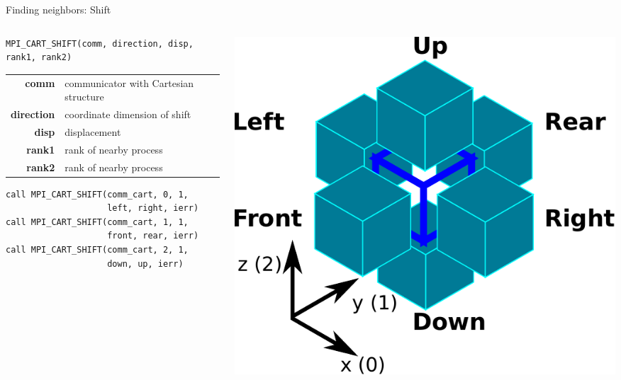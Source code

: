 \documentclass[aspectratio=43]{beamer}
\begin{document}
\begin{frame}[fragile]{Finding neighbors: Shift}
\footnotesize
\vspace{-1.3cm}
\begin{columns}
\begin{column}{0.55\paperwidth}
\begin{verbatim}
MPI_CART_SHIFT(comm, direction, disp, rank1, rank2)
\end{verbatim}
\vspace{-0.2cm}
\begin{black1block}{}
\begin{tabular}{rp{8cm}}
\textbf{comm} & communicator with Cartesian structure\\
\textbf{direction} & coordinate dimension of shift\\
\textbf{disp} & displacement\\
\textbf{rank1} & rank of nearby process\\
\textbf{rank2} & rank of nearby process\\
\end{tabular}
\end{black1block}
\begin{verbatim}
call MPI_CART_SHIFT(comm_cart, 0, 1,
                    left, right, ierr)
call MPI_CART_SHIFT(comm_cart, 1, 1,
                    front, rear, ierr)
call MPI_CART_SHIFT(comm_cart, 2, 1,
                    down, up, ierr)
\end{verbatim}

\end{column}
\begin{column}{0.3\paperwidth}
\vspace{4cm}
\includegraphics[scale=0.36]{04.MPI_Topo/shift.pdf}
\end{column}
\end{columns}

\end{frame}
\end{document}
